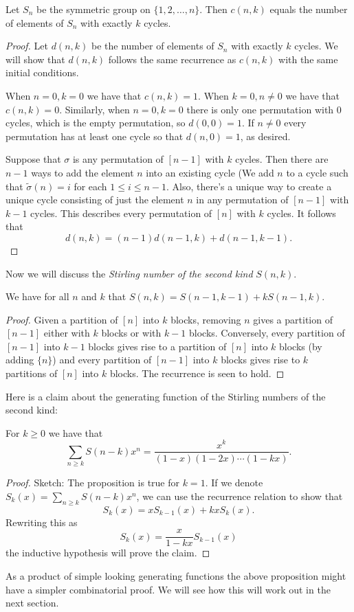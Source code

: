 \begin{theorem}
Let $S_n$ be the symmetric group on $\{1, 2, \dots, n\}$. Then $c(n, k)$ equals the number of elements of $S_n$ with exactly $k$ cycles.
\end{theorem}
\begin{proof}
Let $d(n,k)$ be the number of elements of $S_n$ with exactly $k$ cycles. We will show that $d(n, k)$ follows the same recurrence as $c(n, k)$ with the same initial conditions. 

When $n = 0, k = 0$ we have that $c(n, k) = 1$. When $k = 0, n \neq 0$ we have that $c(n, k) = 0$. Similarly, when $n = 0, k = 0$ there is only one permutation with $0$ cycles, which is the empty permutation, so $d(0, 0) = 1$. If $n \neq 0$ every permutation has at least one cycle so that $d(n, 0) = 1$, as desired.

Suppose that $\sigma$ is any permutation of $[n-1]$ with $k$ cycles. Then there are $n-1$ ways to add the element $n$ into an existing cycle (We add $n$ to a cycle such that $\tilde{\sigma}(n) = i$ for each $1 \leq i \leq n-1$. Also, there's a unique way to create a unique cycle consisting of just the element $n$ in any permutation of $[n-1]$ with $k-1$ cycles. This describes every permutation of $[n]$ with $k$ cycles. It follows that 
\[d(n,k) = (n-1)d(n-1, k) + d(n-1, k-1).\]
\end{proof}

Now we will discuss the \textit{Stirling number of the second kind} $S(n, k)$.
\begin{proposition}
We have for all $n$ and $k$ that $S(n, k) = S(n-1, k-1) + kS(n-1, k)$.
\end{proposition}
\begin{proof}
Given a partition of $[n]$ into $k$ blocks, removing $n$ gives a partition of $[n-1]$ either with $k$ blocks or with $k-1$ blocks. Conversely, every partition of $[n-1]$ into $k-1$ blocks gives rise to a partition of $[n]$ into $k$ blocks (by adding $\{n\}$) and every partition of $[n-1]$ into $k$ blocks gives rise to $k$ partitions of $[n]$ into $k$ blocks. The recurrence is seen to hold.
\end{proof}

Here is a claim about the generating function of the Stirling numbers of the second kind:

\begin{proposition}
For $k \geq 0$ we have that
\[\sum_{n \geq k}S(n-k)x^n = \frac{x^k}{(1-x)(1-2x)\cdots(1-kx)}.\]
\end{proposition}
\begin{proof}
Sketch: The proposition is true for $k = 1$.
If we denote $S_k(x) = \sum_{n \geq k}S(n-k)x^n$, we can use the recurrence relation to show that 
\[S_k(x) = xS_{k-1}(x) + kxS_k(x).\] Rewriting this as
\[S_k(x) = \frac{x}{1-kx}S_{k-1}(x)\] the inductive hypothesis will prove the claim.
\end{proof}

As a product of simple looking generating functions the above proposition might have a simpler combinatorial proof. We will see how this will work out in the next section.